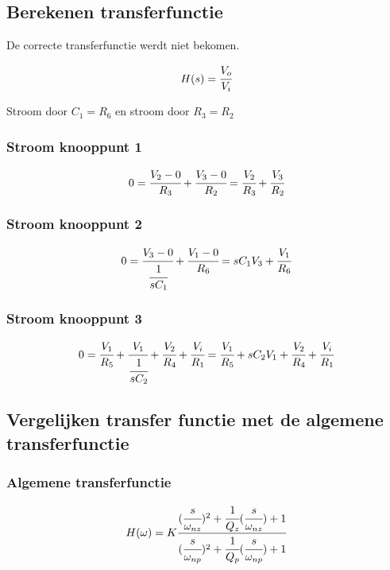 \documentclass[]{article}
\begin{document}
\subsection*{Berekenen transferfunctie}

De correcte transferfunctie werdt niet bekomen.

\begin{equation*}
H(s) = \cfrac{V_{o}}{V_{i}}
\end{equation*}

Stroom door $ C_{1} = R_{6} $
en stroom door $ R_{3} = R_{2} $

\subsubsection*{Stroom knooppunt 1}

\begin{equation*}
0 = \cfrac{V_{2}-0}{R_{3}} + \cfrac{V_{3}-0}{R_{2}} = \cfrac{V_{2}}{R_{3}} + \cfrac{V_{3}}{R_{2}}
\end{equation*}

\subsubsection*{Stroom knooppunt 2}

\begin{equation*}
0 = \cfrac{V_{3}-0}{\cfrac{1}{sC_{1}}} + \cfrac{V_{1}-0}{R_{6}} = sC_{1}V_{3} + \cfrac{V_{1}}{R_{6}}
\end{equation*}

\subsubsection*{Stroom knooppunt 3}

\begin{equation*}
0 = \cfrac{V_{1}}{R_{5}}+\cfrac{V_{1}}{\cfrac{1}{sC_{2}}}+\cfrac{V_{2}}{R_{4}}+\cfrac{V_{i}}{R_{1}} = \cfrac{V_{1}}{R_{5}}+sC_{2}V_{1}+\cfrac{V_{2}}{R_{4}}+\cfrac{V_{i}}{R_{1}} 
\end{equation*}


\subsection*{Vergelijken transfer functie met de algemene transferfunctie}

\subsubsection*{Algemene transferfunctie}
\begin{equation*}
H(\omega) = K 
\cfrac
{(\cfrac{s}{\omega_{nz}})^{2}+\cfrac{1}{Q_{z}}(\cfrac{s}{\omega_{nz}})+1}
{(\cfrac{s}{\omega_{np}})^{2}+\cfrac{1}{Q_{p}}(\cfrac{s}{\omega_{np}})+1}
\end{equation*}
\end{document}
